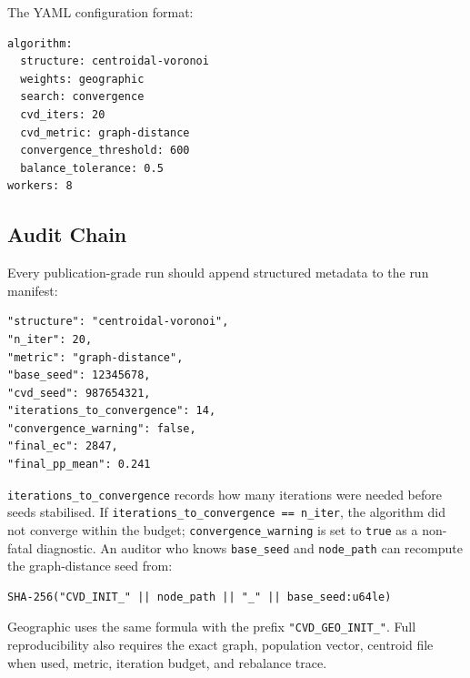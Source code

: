The YAML configuration format:
\begin{verbatim}
algorithm:
  structure: centroidal-voronoi
  weights: geographic
  search: convergence
  cvd_iters: 20
  cvd_metric: graph-distance
  convergence_threshold: 600
  balance_tolerance: 0.5
workers: 8
\end{verbatim}

\subsection{Audit Chain}

Every publication-grade \cvd{} run should append structured metadata to
the run manifest:

\begin{verbatim}
"structure": "centroidal-voronoi",
"n_iter": 20,
"metric": "graph-distance",
"base_seed": 12345678,
"cvd_seed": 987654321,
"iterations_to_convergence": 14,
"convergence_warning": false,
"final_ec": 2847,
"final_pp_mean": 0.241
\end{verbatim}

\texttt{iterations\_to\_convergence} records how many iterations were needed
before seeds stabilised.
If \texttt{iterations\_to\_convergence == n\_iter}, the algorithm did not
converge within the budget; \texttt{convergence\_warning} is set to
\texttt{true} as a non-fatal diagnostic.
An auditor who knows \texttt{base\_seed} and \texttt{node\_path} can recompute
the graph-distance seed from:
\begin{verbatim}
SHA-256("CVD_INIT_" || node_path || "_" || base_seed:u64le)
\end{verbatim}
Geographic \cvd{} uses the same formula with the prefix
\texttt{"CVD\_GEO\_INIT\_"}.
Full reproducibility also requires the exact graph, population vector,
centroid file when used, metric, iteration budget, and rebalance trace.
